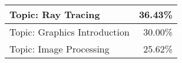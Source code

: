 \documentclass[sigconf,authordraft]{acmart}
\begin{document}
\begin{table*}
\begin{tabular}{|l|r|}
        Topic: Ray Tracing & 36.43\% \\ \hline
        Topic: Graphics Introduction & 30.00\% \\ \hline
        Topic: Image Processing & 25.62\% \\ \hline
    \end{tabular}
\end{table*}
\end{document}
